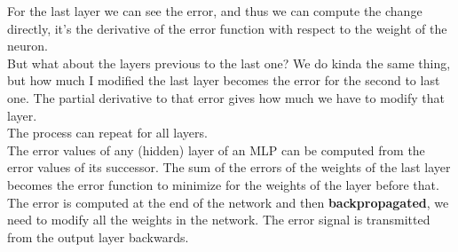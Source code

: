 \documentclass[11pt]{article}
\begin{document}
		For the last layer we can see the error, and thus we can compute the change directly, it's the derivative of the error function with respect to the weight of the neuron.\\
		But what about the layers previous to the last one? We do kinda the same thing, but how much I modified the last layer becomes the error for the second to last one. The partial derivative to that error gives how much we have to modify that layer.\\
		The process can repeat for all layers.\\
		
		The error values of any (hidden) layer of an MLP can be computed from the error values of its successor. The sum of the errors of the weights of the last layer becomes the error function to minimize for the weights of the layer before that.\\
		
		The error is computed at the end of the network and then \textbf{backpropagated}, we need to modify all the weights in the network. The error signal is transmitted from the output layer backwards.\\
		
		\newpage
		
\end{document}
